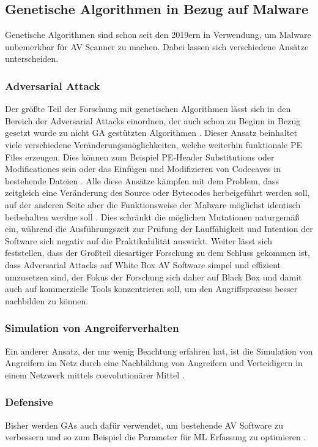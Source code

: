 \subsection{Genetische Algorithmen in Bezug auf Malware}
Genetische Algorithmen sind schon seit den 2019ern \cite{castro_2019_aimed} in Verwendung, um Malware unbemerkbar für AV Scanner zu machen. Dabei lassen sich verschiedene Ansätze unterscheiden.
\subsubsection{Adversarial Attack}
\label{Adversarial_Genetic_Algos}
Der größte Teil der Forschung mit genetischen Algorithmen lässt sich in den Bereich der Adversarial Attacks einordnen, der auch schon zu Beginn in Bezug gesetzt wurde zu nicht GA gestützten Algorithmen \cite{castro_2019_armed}. Dieser Ansatz beinhaltet viele verschiedene Veränderungsmöglichkeiten, welche weiterhin funktionale PE Files erzeugen.
Dies können zum Beispiel PE-Header Substitutions oder Modificationes sein \cite{demetrio_2021_adversarial} oder das Einfügen und Modifizieren von Codecaves in bestehende Dateien \cite{yuste_2022_optimization}. Alle diese Ansätze kämpfen mit dem Problem, dass zeitgleich eine Veränderung des Source oder Bytecodes herbeigeführt werden soll, auf der anderen Seite aber die Funktionsweise der Malware möglichst identisch beibehalten werdne soll \cite{demetrio_2021_functionalitypreserving}. Dies schränkt die möglichen Mutationen naturgemäß ein, während die Ausführungszeit zur Prüfung der Lauffähigkeit und Intention der Software sich negativ auf die Praktikabilität auswirkt. 
Weiter lässt sich feststellen, dass der Großteil diesartiger Forschung zu dem Schluss gekommen ist, dass Adversarial Attacks auf White Box AV Software simpel und effizient umzusetzen sind, der Fokus der Forschung sich daher auf Black Box und damit auch auf kommerzielle Tools konzentrieren soll, um den Angriffsprozess besser nachbilden zu können.
\subsubsection{Simulation von Angreiferverhalten}
Ein anderer Ansatz, der nur wenig Beachtung erfahren hat, ist die Simulation von Angreifern im Netz durch eine Nachbildung von Angreifern und Verteidigern in einem Netzwerk mittels coevolutionärer Mittel \cite{alejandro_2024_a}.
\subsubsection{Defensive}
Bisher werden GAs auch dafür verwendet, um bestehende AV Software zu verbessern und so zum Beispiel die Parameter für ML Erfassung zu optimieren \cite{xie_2023_gastackingmd}.
